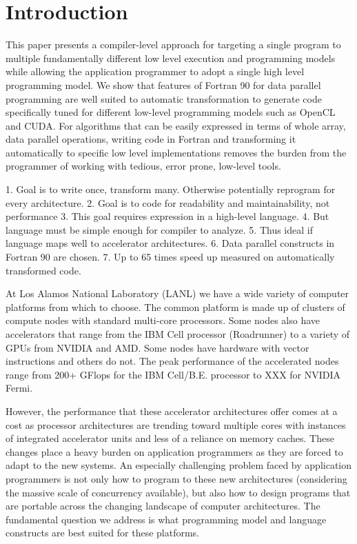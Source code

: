 \section{Introduction}
\label{sec:intro}

This paper presents a compiler-level approach for targeting a single
program to multiple fundamentally different low level execution and
programming models while allowing the application programmer to adopt
a single high level programming model.  We show that features of
Fortran 90 for data parallel programming are well suited to automatic
transformation to generate code specifically tuned for different
low-level programming models such as OpenCL and CUDA.  For algorithms
that can be easily expressed in terms of whole array, data parallel
operations, writing code in Fortran and transforming it automatically
to specific low level implementations removes the burden from the
programmer of working with tedious, error prone, low-level tools.

1. Goal is to write once, transform many. Otherwise potentially reprogram for every architecture.
2. Goal is to code for readability and maintainability, not performance
3. This goal requires expression in a high-level language.
4. But language must be simple enough for compiler to analyze.
5. Thus ideal if language maps well to accelerator architectures.
6. Data parallel constructs in Fortran 90 are chosen.
7. Up to 65 times speed up measured on automatically transformed code.

At Los Alamos National Laboratory (LANL) we have a wide variety of computer
platforms from which to choose.  The common platform is made up of clusters of
compute nodes with standard multi-core processors.  Some nodes also have
accelerators that range from the IBM Cell processor (Roadrunner) to a variety
of GPUs from NVIDIA and AMD.  Some nodes have hardware with vector
instructions and others do not. The peak
performance of the accelerated nodes range from 200+ GFlops for the IBM Cell/B.E.
processor to XXX for NVIDIA Fermi. %

However, the performance that these accelerator architectures offer comes at a
cost as processor architectures are trending toward multiple cores with
instances of integrated accelerator units and less of a reliance on memory
caches.  These changes place a heavy burden on application programmers as they
are forced to adapt to the new systems.  An especially challenging problem
faced by application programmers is not only how to program to these new
architectures (considering the massive scale of concurrency available), but
also how to design programs that are portable across the changing landscape of
computer architectures.  The fundamental question we address is what
programming model and language constructs are best suited for these platforms.

